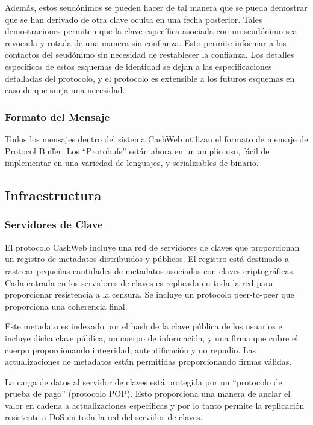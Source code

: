 \documentclass{article}
\begin{document}
Además, estos seudónimos se pueden hacer de tal manera que se pueda demostrar que se han derivado de otra clave oculta en una fecha posterior. Tales demostraciones permiten que la clave específica asociada con un seudónimo sea revocada y rotada de una manera sin confianza. Esto permite informar a los contactos del seudónimo sin necesidad de restablecer la confianza. Los detalles específicos de estos esquemas de identidad se dejan a las especificaciones detalladas del protocolo, y el protocolo es extensible a los futuros esquemas en caso de que surja una necesidad.

\subsubsection{Formato del Mensaje}

Todos los mensajes dentro del sistema CashWeb utilizan el formato de mensaje de Protocol Buffer\supercite{protobufs}. Los ``Protobufs'' están ahora en un amplio uso, fácil de implementar en una variedad de lenguajes, y serializables de binario.

\subsection{Infraestructura}

\subsubsection{Servidores de Clave}

El protocolo CashWeb incluye una red de servidores de claves que proporcionan un registro de metadatos distribuidos y públicos. El registro está destinado a rastrear pequeñas cantidades de metadatos asociados con claves criptográficas. Cada entrada en los servidores de claves es replicada en toda la red para proporcionar resistencia a la censura. Se incluye un protocolo peer-to-peer que proporciona una coherencia final.

Este metadato es indexado por el hash de la clave pública de los usuarios e incluye dicha clave pública, un cuerpo de información, y una firma que cubre el cuerpo proporcionando integridad, autentificación y no repudio. Las actualizaciones de metadatos están permitidas proporcionando firmas válidas.

La carga de datos al servidor de claves está protegida por un ``protocolo de prueba de pago'' (protocolo POP). Esto proporciona una manera de anclar el valor en cadena a actualizaciones específicas y por lo tanto permite la replicación resistente a DoS en toda la red del servidor de claves.
\end{document}
